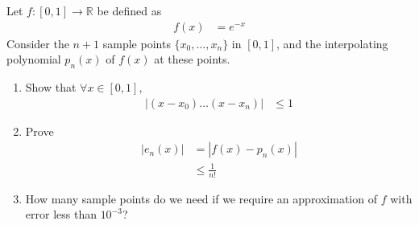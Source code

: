 \documentclass[fleqn, a4paper, 11pt, oneside]{amsart}
\theoremstyle{definition}
\theoremstyle{theorem}
\begin{document}
\begin{question}
	Let $f : [0,1] \to \mathbb{R}$ be defined as
	\begin{align*}
		f(x) & = e^{-x}
	\end{align*}
	Consider the $n + 1$ sample points $\{x_0,\dots,x_n\}$ in $[0,1]$, and the interpolating polynomial $p_n(x)$ of $f(x)$ at these points.
	\begin{enumerate}
		\item
			Show that $\forall x \in [0,1]$,
			\begin{align*}
				\left| (x - x_0) \dots (x - x_n) \right| & \le 1
			\end{align*}
		\item
			Prove
			\begin{align*}
				\left| e_n(x) \right| & = \left| f(x) - p_n(x) \right| \\
                                                      & \le \frac{1}{n!}
			\end{align*}
		\item
			How many sample points do we need if we require an approximation of $f$ with error less than $10^{-3}$?
	\end{enumerate}
\end{question}
\end{document}
